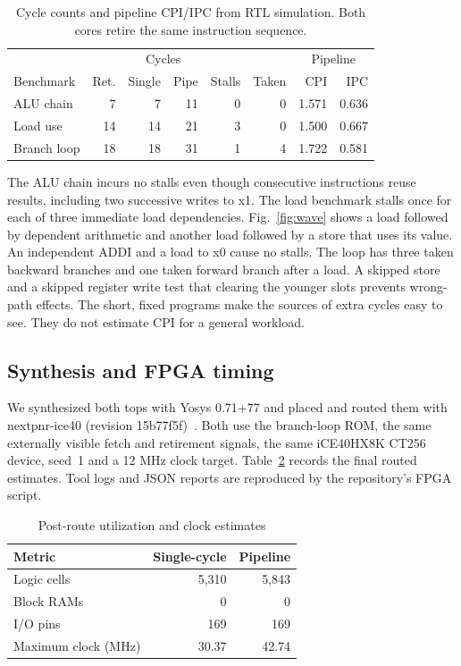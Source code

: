 \documentclass[conference]{IEEEtran}
\begin{document}
\begin{table}[!t]
\caption{Cycle counts and pipeline CPI/IPC from RTL simulation. Both cores retire the same instruction sequence.}
\label{tab:bench}\centering\footnotesize
\setlength{\tabcolsep}{2.3pt}
\begin{tabular}{lrrrrrrr}\hline
 & & \multicolumn{2}{c}{Cycles} & & & \multicolumn{2}{c}{Pipeline}\\
Benchmark & Ret. & Single & Pipe & Stalls & Taken & CPI & IPC\\\hline
ALU chain   &  7 &  7 & 11 & 0 & 0 & 1.571 & 0.636\\
Load use    & 14 & 14 & 21 & 3 & 0 & 1.500 & 0.667\\
Branch loop & 18 & 18 & 31 & 1 & 4 & 1.722 & 0.581\\\hline
\end{tabular}
\end{table}

The ALU chain incurs no stalls even though consecutive instructions reuse results, including two successive writes to x1. The load benchmark stalls once for each of three immediate load dependencies. Fig.~\ref{fig:wave} shows a load followed by dependent arithmetic and another load followed by a store that uses its value. An independent ADDI and a load to x0 cause no stalls. The loop has three taken backward branches and one taken forward branch after a load. A skipped store and a skipped register write test that clearing the younger slots prevents wrong-path effects. The short, fixed programs make the sources of extra cycles easy to see. They do not estimate CPI for a general workload.

\subsection{Synthesis and FPGA timing}
We synthesized both tops with Yosys 0.71+77 and placed and routed them with nextpnr-ice40 (revision 15b77f5f)~\cite{fpga}. Both use the branch-loop ROM, the same externally visible fetch and retirement signals, the same iCE40HX8K CT256 device, seed~1 and a 12 MHz clock target. Table~\ref{tab:fpga} records the final routed estimates. Tool logs and JSON reports are reproduced by the repository's FPGA script.

\begin{table}[t]
\caption{Post-route utilization and clock estimates}
\label{tab:fpga}\centering
\begin{tabular}{lrr}\hline
Metric & Single-cycle & Pipeline\\\hline
Logic cells & 5,310 & 5,843\\
Block RAMs & 0 & 0\\
I/O pins & 169 & 169\\
Maximum clock (MHz) & 30.37 & 42.74\\\hline
\end{tabular}
\end{table}
\end{document}
